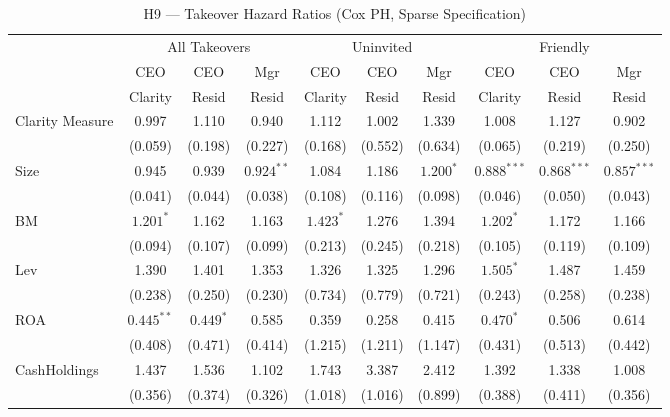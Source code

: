 \documentclass[12pt,a4paper]{article}
\begin{document}
\begin{table}[H]
\centering
\caption{H9 --- Takeover Hazard Ratios (Cox PH, Sparse Specification)}
\label{tab:h9}
\begin{threeparttable}
\begin{scriptsize}
\renewcommand{\arraystretch}{0.85}
\begin{tabular}{lccccccccc}
\toprule
& \multicolumn{3}{c}{All Takeovers} & \multicolumn{3}{c}{Uninvited} & \multicolumn{3}{c}{Friendly} \\
\cmidrule(lr){2-4} \cmidrule(lr){5-7} \cmidrule(lr){8-10}
& CEO & CEO & Mgr & CEO & CEO & Mgr & CEO & CEO & Mgr \\
& Clarity & Resid & Resid & Clarity & Resid & Resid & Clarity & Resid & Resid \\
\midrule
Clarity Measure & 0.997 & 1.110 & 0.940 & 1.112 & 1.002 & 1.339 & 1.008 & 1.127 & 0.902 \\
 & (0.059) & (0.198) & (0.227) & (0.168) & (0.552) & (0.634) & (0.065) & (0.219) & (0.250) \\[1pt]
Size & 0.945 & 0.939 & $\mathbf{0.924}^{**}$ & 1.084 & 1.186 & $\mathbf{1.200}^{*}$ & $\mathbf{0.888}^{***}$ & $\mathbf{0.868}^{***}$ & $\mathbf{0.857}^{***}$ \\
 & (0.041) & (0.044) & (0.038) & (0.108) & (0.116) & (0.098) & (0.046) & (0.050) & (0.043) \\[1pt]
BM & $\mathbf{1.201}^{*}$ & 1.162 & 1.163 & $\mathbf{1.423}^{*}$ & 1.276 & 1.394 & $\mathbf{1.202}^{*}$ & 1.172 & 1.166 \\
 & (0.094) & (0.107) & (0.099) & (0.213) & (0.245) & (0.218) & (0.105) & (0.119) & (0.109) \\[1pt]
Lev & 1.390 & 1.401 & 1.353 & 1.326 & 1.325 & 1.296 & $\mathbf{1.505}^{*}$ & 1.487 & 1.459 \\
 & (0.238) & (0.250) & (0.230) & (0.734) & (0.779) & (0.721) & (0.243) & (0.258) & (0.238) \\[1pt]
ROA & $\mathbf{0.445}^{**}$ & $\mathbf{0.449}^{*}$ & 0.585 & 0.359 & 0.258 & 0.415 & $\mathbf{0.470}^{*}$ & 0.506 & 0.614 \\
 & (0.408) & (0.471) & (0.414) & (1.215) & (1.211) & (1.147) & (0.431) & (0.513) & (0.442) \\[1pt]
CashHoldings & 1.437 & 1.536 & 1.102 & 1.743 & 3.387 & 2.412 & 1.392 & 1.338 & 1.008 \\
 & (0.356) & (0.374) & (0.326) & (1.018) & (1.016) & (0.899) & (0.388) & (0.411) & (0.356) \\[1pt]

\end{tabular}
\end{scriptsize}
\end{threeparttable}
\end{table}
\end{document}
